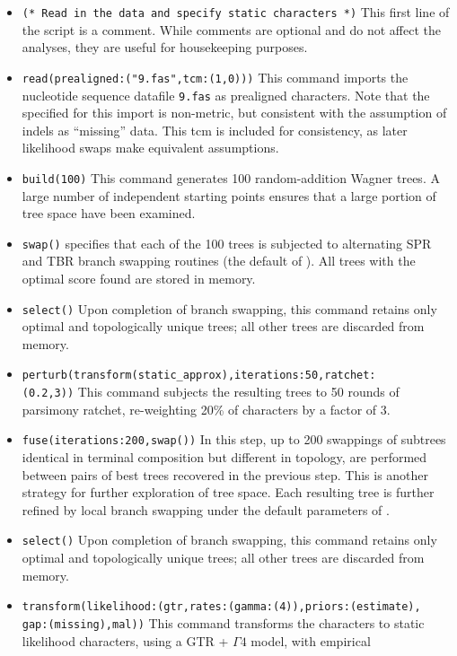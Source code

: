 \begin{itemize}
\item \texttt{(* Read in the data and specify static characters *)} This first line of the script is a comment. While 
comments are optional and do not affect the analyses, they are useful for housekeeping purposes.
\item \texttt{read(prealigned:("9.fas",tcm:(1,0)))}
This command imports the nucleotide sequence datafile \texttt{9.fas} as prealigned characters. Note that the 
 specified for this import is non-metric, but consistent with the assumption of indels as 
``missing'' data. This tcm is included for consistency, as later likelihood swaps make equivalent assumptions.
\item \texttt{build(100)} This command generates 100 random-addition Wagner trees. A large number of 
independent starting points ensures that a large portion of tree space have been examined.
\item \texttt{swap()}  specifies that each of the 100 trees is subjected to alternating SPR and 
TBR branch swapping routines (the default of \poy). All trees with the optimal score found are stored in memory.
\item \texttt{select()} Upon completion of branch swapping, this command retains only optimal and topologically 
unique trees; all other trees are discarded from memory. 
\item \texttt{perturb(transform(static\_approx),iterations:50,ratchet:\\(0.2,3))} This command subjects the resulting 
trees to 50 rounds of parsimony ratchet, re-weighting 20\% of characters by a factor of 3.
\item \texttt{fuse(iterations:200,swap())} In this step, up to 200 swappings of subtrees identical in terminal 
composition but different in topology, are performed between pairs of best trees recovered in the previous step. 
This is another strategy for further exploration of tree space. Each resulting tree is further refined by local branch 
swapping under the default parameters of .
\item \texttt{select()} Upon completion of branch swapping, this command retains only optimal and topologically
 unique trees; all other trees are discarded from memory.
\item \texttt{transform(likelihood:(gtr,rates:(gamma:(4)),priors:(estimate),\\gap:(missing),mal))} This command 
transforms the characters to static likelihood characters, using a GTR + $\Gamma 4$ model, with empirical 

\end{itemize}
